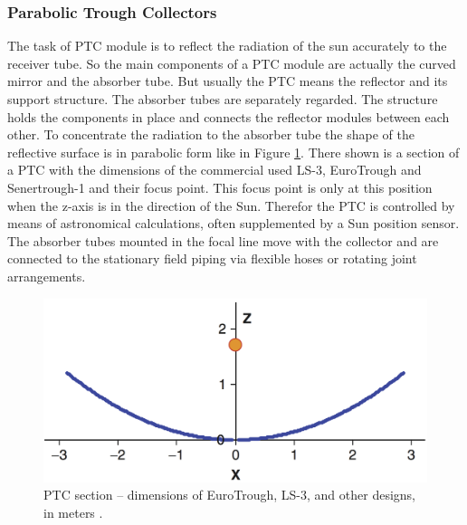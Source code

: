 \subsubsection{Parabolic Trough Collectors}
The task of PTC module is to reflect the radiation of the sun accurately to the receiver tube. So the main components of a PTC module are actually the curved mirror and the absorber tube. But usually the PTC means the reflector and its support structure. The absorber tubes are separately regarded. The structure holds the components in place and connects the reflector modules between each other. To concentrate the radiation to the absorber tube the shape of the reflective surface is in parabolic form like in Figure \ref{PTC_section}. There shown is a section of a PTC with the dimensions of the commercial used LS-3, EuroTrough and Senertrough-1 and their focus point. This focus point is only at this position when the z-axis is in the direction of the Sun. Therefor the PTC is controlled by means of astronomical calculations, often supplemented by a Sun position sensor. The absorber tubes mounted in the focal line move with the collector and are connected to the stationary field piping via flexible hoses or rotating joint arrangements.
\begin{figure}[!h] 
\centering
\includegraphics[width=0.6\linewidth]{FIG/PTC_section}
\caption[PTC section – dimensions of EuroTrough, LS-3, and other designs, in meters.]{PTC section – dimensions of EuroTrough, LS-3, and other designs, in meters \cite{Lupfert2013}.}\label{PTC_section}
\end{figure}


